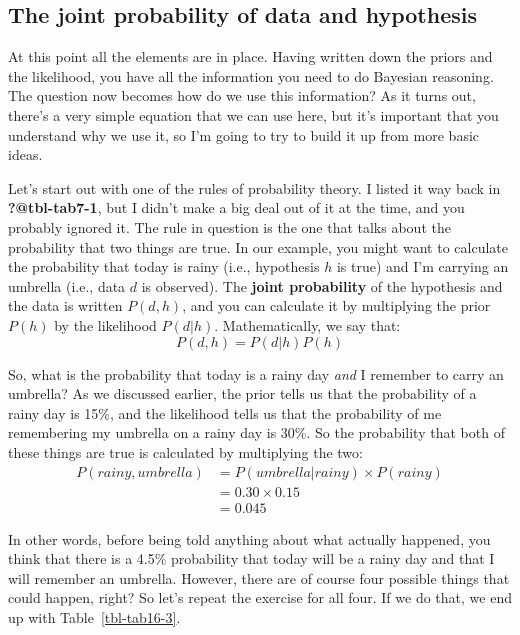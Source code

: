 \documentclass[
  a4paper,
]{book}
\begin{document}
\hypertarget{the-joint-probability-of-data-and-hypothesis}{%
\subsection{The joint probability of data and
hypothesis}\label{the-joint-probability-of-data-and-hypothesis}}

At this point all the elements are in place. Having written down the
priors and the likelihood, you have all the information you need to do
Bayesian reasoning. The question now becomes how do we use this
information? As it turns out, there's a very simple equation that we can
use here, but it's important that you understand why we use it, so I'm
going to try to build it up from more basic ideas.

Let's start out with one of the rules of probability theory. I listed it
way back in \textbf{?@tbl-tab7-1}, but I didn't make a big deal out of
it at the time, and you probably ignored it. The rule in question is the
one that talks about the probability that two things are true. In our
example, you might want to calculate the probability that today is rainy
(i.e., hypothesis \(h\) is true) and I'm carrying an umbrella (i.e.,
data \(d\) is observed). The \textbf{joint probability} of the
hypothesis and the data is written \(P(d,h)\), and you can calculate it
by multiplying the prior \(P(h)\) by the likelihood \(P(d|h)\).
Mathematically, we say that: \[P(d,h)=P(d|h)P(h)\]

So, what is the probability that today is a rainy day \emph{and} I
remember to carry an umbrella? As we discussed earlier, the prior tells
us that the probability of a rainy day is 15\%, and the likelihood tells
us that the probability of me remembering my umbrella on a rainy day is
30\%. So the probability that both of these things are true is
calculated by multiplying the two: \[
\begin{split}
P(rainy, umbrella) & = P(umbrella|rainy) \times P(rainy) \\
& = 0.30 \times 0.15 \\
& = 0.045
\end{split}
\]

In other words, before being told anything about what actually happened,
you think that there is a 4.5\% probability that today will be a rainy
day and that I will remember an umbrella. However, there are of course
four possible things that could happen, right? So let's repeat the
exercise for all four. If we do that, we end up with
Table~\ref{tbl-tab16-3}.
\end{document}
